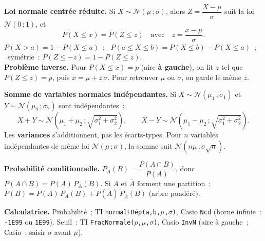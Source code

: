 \documentclass[a4paper,11pt]{article}
\begin{document}
\begin{rappel}
\textbf{Loi normale centrée réduite.} Si $X \sim \mathcal{N}(\mu\,;\sigma)$, alors $Z = \dfrac{X-\mu}{\sigma}$ suit la loi $\mathcal{N}(0\,;1)$, et
\[ P(X \leq x) = P(Z \leq z) \quad\text{avec}\quad z = \frac{x-\mu}{\sigma}. \]
$P(X > a) = 1 - P(X \leq a)$~; \ $P(a \leq X \leq b) = P(X \leq b) - P(X \leq a)$~; \ symétrie~: $P(Z \leq -z) = 1 - P(Z \leq z)$.\\
\textbf{Problème inverse.} Pour $P(X \leq x) = p$ (aire \textbf{à gauche}), on lit $z$ tel que $P(Z \leq z) = p$, puis $x = \mu + z\,\sigma$. Pour retrouver $\mu$ ou $\sigma$, on garde le même $z$.

\smallskip
\textbf{Somme de variables normales indépendantes.} Si $X \sim \mathcal{N}(\mu_1\,;\sigma_1)$ et $Y \sim \mathcal{N}(\mu_2\,;\sigma_2)$ sont indépendantes~:
\[ X+Y \sim \mathcal{N}\!\left(\mu_1+\mu_2\,;\sqrt{\sigma_1^2+\sigma_2^2}\right), \qquad X-Y \sim \mathcal{N}\!\left(\mu_1-\mu_2\,;\sqrt{\sigma_1^2+\sigma_2^2}\right). \]
Les \textbf{variances} s'additionnent, pas les écarts-types. Pour $n$ variables indépendantes de même loi $\mathcal{N}(\mu\,;\sigma)$, la somme suit $\mathcal{N}(n\mu\,;\sigma\sqrt{n})$.

\smallskip
\textbf{Probabilité conditionnelle.} $P_A(B) = \dfrac{P(A \cap B)}{P(A)}$, donc $P(A \cap B) = P(A)\,P_A(B)$. Si $A$ et $\overline{A}$ forment une partition~: $P(B) = P(A)\,P_A(B) + P(\overline{A})\,P_{\overline{A}}(B)$ (arbre pondéré).

\smallskip
\textbf{Calculatrice.} Probabilité~: TI \texttt{normalFRép(a,b,$\mu$,$\sigma$)}, Casio \texttt{Ncd} (borne infinie~: \texttt{-1E99} ou \texttt{1E99}). Seuil~: TI \texttt{FracNormale($p$,$\mu$,$\sigma$)}, Casio \texttt{InvN} (aire à gauche~; Casio~: saisir $\sigma$ avant $\mu$).
\end{rappel}

\newpage
\end{document}
